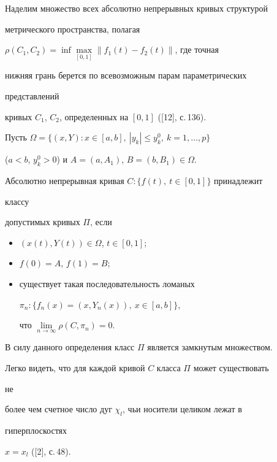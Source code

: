  


Наделим множество всех абсолютно непрерывных кривых структурой 


метрического пространства, полагая 


$\rho(C_1,C_2)=\inf\max\limits_{[0,1]}\|f_1(t)-f_2(t)\|$, где точная 


нижняя грань берется по всевозможным парам параметрических 


представлений 


кривых $C_1$, $C_2$, определенных на $[0,1]$ ([12], с.\,136). 


 


Пусть $\Omega=\{(x,Y):x\in[a,b],\ |y_k|\le y^0_k,\ k=1,\dotsc,p\}$ 


($a<b$, $y^0_k>0$) и $A=(a,A_1)$, $B=(b,B_1)\in\Omega$. 


 


Абсолютно непрерывная кривая $C:\{f(t),\ t\in[0,1]\}$ принадлежит 


классу 


допустимых кривых $\Pi$, если 


\begin{itemize} 


\item[1)] $(x(t),Y(t))\in\Omega$, $t\in[0,1]$; 


\item[2)] $f(0)=A$, $f(1)=B$; 


\item[3)] существует такая последовательность ломаных 


$\pi_n:\{f_n(x)=(x,Y_n(x)),\ x\in[a,b]\}$, 


что $\lim\limits_{n\to\infty}\rho(C,\pi_n)=0$. 


\end{itemize} 


 


В силу данного определения класс $\Pi$ является замкнутым множеством. 


Легко видеть, что для каждой кривой $C$ класса $\Pi$ может существовать 


не 


более чем счетное число дуг $\chi_l$, чьи носители целиком лежат в 


гиперплоскостях 


$x=x_l$ ([2], с.\,48). 


 


